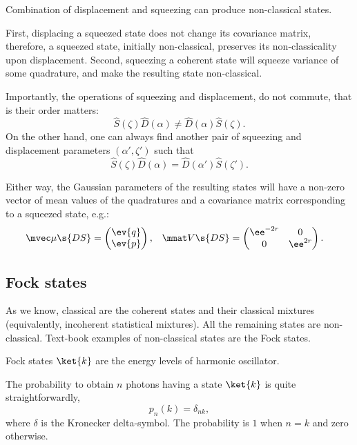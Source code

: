 \documentclass[fontsize=9pt]{scrartcl}
\begin{document}
Combination of displacement and squeezing can produce non-classical states.

First, displacing a squeezed state does not change its covariance matrix, therefore, a squeezed state, initially non-classical, preserves its non-classicality upon displacement.
Second, squeezing a coherent state will squeeze variance of some quadrature, and make the resulting state non-classical.

Importantly, the operations of squeezing and displacement, do not commute, that is their order matters:
\begin{equation}
  \hat S ( \zeta ) \hat D ( \alpha )  \neq \hat D (\alpha ) \hat S ( \zeta ).
\end{equation}
On the other hand, one can always find another pair of squeezing and displacement parameters $(\alpha', \zeta')$ such that
\begin{equation}
  \hat S ( \zeta ) \hat D ( \alpha ) = \hat D (\alpha' ) \hat S ( \zeta' ).
\end{equation}

Either way, the Gaussian parameters of the resulting states will have a non-zero vector of mean values of the quadratures and a covariance matrix corresponding to a squeezed state, e.g.:
\begin{align}
  \mvec \mu\s{DS} & =
  \begin{pmatrix}
    \ev{q} \\ \ev{ p}
  \end{pmatrix},
  &
  \mmat V\s{DS} & =
  \begin{pmatrix}
    \ee^{ - 2 r } & 0 
    \\
    0 & \ee^{ 2 r }
  \end{pmatrix}.
\end{align}

\subsection{Fock states} %
\label{sec:fock_states}

As we know, classical are the coherent states and their classical mixtures (equivalently, incoherent statistical mixtures).
All the remaining states are non-classical.
Text-book examples of non-classical states are the Fock states.

Fock states $\ket{k}$ are the energy levels of harmonic oscillator.

The probability to obtain $n$ photons having a state $\ket{k}$ is quite straightforwardly,
\begin{equation}
  p_n (k) = \delta_{nk },
\end{equation}
where $\delta$ is the Kronecker delta-symbol.
The probability is $1$ when $n = k$ and zero otherwise.
\end{document}
